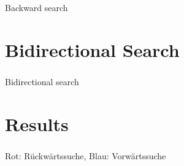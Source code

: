 \documentclass{beamer}
\begin{document}
\begin{frame}
    \frametitle{\insertsection}

    Backward search

\end{frame}

\begin{frame}
    \frametitle{\insertsection}

    \centering

    

\end{frame}

\section{Bidirectional Search}

\begin{frame}
    \frametitle{\insertsection}

    Bidirectional search

\end{frame}

\section{Results}

\begin{frame}
    \frametitle{\insertsection}

    \centering

    {\color{red} Rot: Rückwärtssuche},
    {\color{blue} Blau: Vorwärtssuche}

    

\end{frame}
\end{document}
